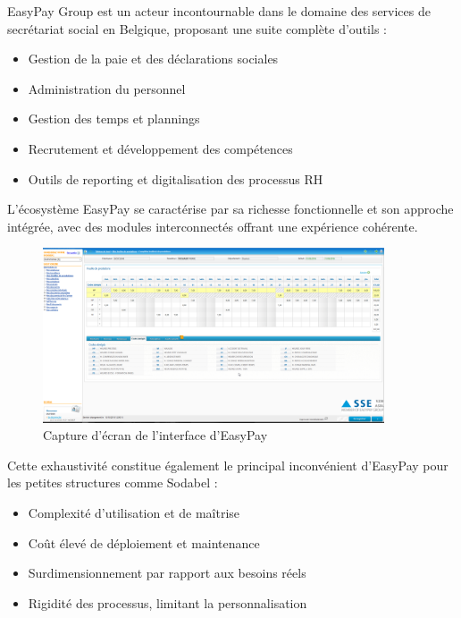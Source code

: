\newpage
\noindent EasyPay Group est un acteur incontournable dans le domaine des services de secrétariat social en Belgique, proposant une suite complète d'outils :

\begin{itemize}[leftmargin=*,label=\textcolor{darkgray}{$\bullet$},itemsep=0.3em]
  \item Gestion de la paie et des déclarations sociales
  \item Administration du personnel
  \item Gestion des temps et plannings
  \item Recrutement et développement des compétences
  \item Outils de reporting et digitalisation des processus RH
\end{itemize}

\noindent L'écosystème EasyPay se caractérise par sa richesse fonctionnelle et son approche intégrée, avec des modules interconnectés offrant une expérience cohérente.

\begin{figure}[H]
    \centering
    \includegraphics[width=0.9\textwidth]{easyPayScreenshot.png}
    \caption{Capture d'écran de l'interface d'EasyPay \cite{easypay}}
    \label{fig:easyPayScreenshot}
\end{figure}

\begin{tcolorbox}[
  title={\textbf{Limites pour les petites structures}},
  colback=blue!5!white,
  colframe=primarycolor,
  fonttitle=\bfseries,
  boxrule=0.5mm,
  arc=2mm,
  left=6mm,
  right=6mm,
  top=6mm,
  bottom=6mm
]
\noindent Cette exhaustivité constitue également le principal inconvénient d'EasyPay pour les petites structures comme Sodabel :
\begin{itemize}[leftmargin=*,label=\textcolor{darkgray}{$\bullet$},itemsep=0.3em]
  \item Complexité d'utilisation et de maîtrise
  \item Coût élevé de déploiement et maintenance
  \item Surdimensionnement par rapport aux besoins réels
  \item Rigidité des processus, limitant la personnalisation
\end{itemize}
\end{tcolorbox}

